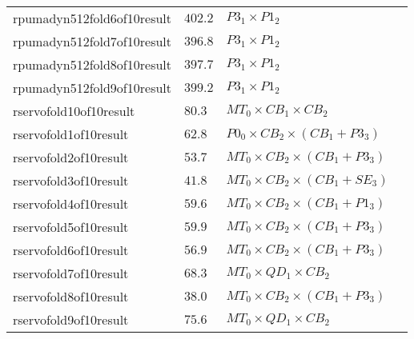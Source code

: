 \begin{table*}[h!]
\begin{center}
\begin{tabular}{l | l l l}
rpumadyn512fold6of10result & $ 402.2 $ & $ P3_{1} \times P1_{2} $ \\
rpumadyn512fold7of10result & $ 396.8 $ & $ P3_{1} \times P1_{2} $ \\
rpumadyn512fold8of10result & $ 397.7 $ & $ P3_{1} \times P1_{2} $ \\
rpumadyn512fold9of10result & $ 399.2 $ & $ P3_{1} \times P1_{2} $ \\
rservofold10of10result & $ 80.3 $ & $ MT_{0} \times CB_{1} \times CB_{2} $ \\
rservofold1of10result & $ 62.8 $ & $ P0_{0} \times CB_{2} \times \left( CB_{1} + P3_{3} \right) $ \\
rservofold2of10result & $ 53.7 $ & $ MT_{0} \times CB_{2} \times \left( CB_{1} + P3_{3} \right) $ \\
rservofold3of10result & $ 41.8 $ & $ MT_{0} \times CB_{2} \times \left( CB_{1} + SE_{3} \right) $ \\
rservofold4of10result & $ 59.6 $ & $ MT_{0} \times CB_{2} \times \left( CB_{1} + P1_{3} \right) $ \\
rservofold5of10result & $ 59.9 $ & $ MT_{0} \times CB_{2} \times \left( CB_{1} + P3_{3} \right) $ \\
rservofold6of10result & $ 56.9 $ & $ MT_{0} \times CB_{2} \times \left( CB_{1} + P3_{3} \right) $ \\
rservofold7of10result & $ 68.3 $ & $ MT_{0} \times QD_{1} \times CB_{2} $ \\
rservofold8of10result & $ 38.0 $ & $ MT_{0} \times CB_{2} \times \left( CB_{1} + P3_{3} \right) $ \\
rservofold9of10result & $ 75.6 $ & $ MT_{0} \times QD_{1} \times CB_{2} $ \\
\end{tabular}
\end{center}
\end{table*}
